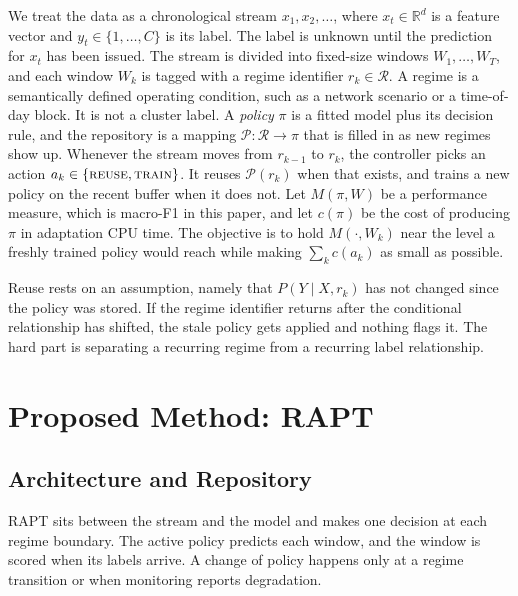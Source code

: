 \documentclass[conference]{IEEEtran}
\begin{document}
We treat the data as a chronological stream $x_1, x_2, \dots$, where
$x_t \in \mathbb{R}^d$ is a feature vector and $y_t \in \{1,\dots,C\}$ is its label. The
label is unknown until the prediction for $x_t$ has been issued. The stream is divided
into fixed-size windows $W_1, \dots, W_T$, and each window $W_k$ is tagged with a regime
identifier $r_k \in \mathcal{R}$. A regime is a semantically defined operating
condition, such as a network scenario or a time-of-day block. It is not a cluster label.
A \emph{policy} $\pi$ is a fitted model plus its decision rule, and the repository is a
mapping $\mathcal{P}: \mathcal{R} \rightarrow \pi$ that is filled in as new regimes show
up. Whenever the stream moves from $r_{k-1}$ to $r_k$, the controller picks an action
$a_k \in \{\textsc{reuse}, \textsc{train}\}$. It reuses $\mathcal{P}(r_k)$ when that
exists, and trains a new policy on the recent buffer when it does not. Let $M(\pi, W)$
be a performance measure, which is macro-F1 in this paper, and let $c(\pi)$ be the cost
of producing $\pi$ in adaptation CPU time. The objective is to hold $M(\cdot, W_k)$ near
the level a freshly trained policy would reach while making $\sum_k c(a_k)$ as small as
possible.


Reuse rests on an assumption, namely that $P(Y \mid X, r_k)$ has not changed since the
policy was stored. If the regime identifier returns after the conditional relationship
has shifted, the stale policy gets applied and nothing flags it. The hard part is
separating a recurring regime from a recurring label relationship.


\section{Proposed Method: RAPT}
\label{sec:method}


\subsection{Architecture and Repository}
RAPT sits between the stream and the model and makes one decision at each regime
boundary. The active policy predicts each window, and the window is scored when its
labels arrive. A change of policy happens only at a regime transition or when
monitoring reports degradation.
\end{document}
